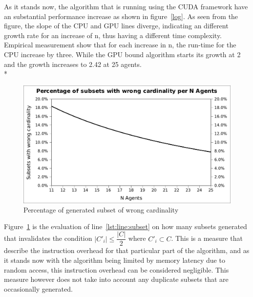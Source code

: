 \documentclass[a4paper, 12pt]{report}
\begin{document}
As it stands now, the algorithm that is running using the CUDA framework have an substantial performance increase as shown in figure~\ref{log}.
As seen from the figure, the slope of the CPU and GPU lines diverge, indicating an different growth rate for an increase of n, thus having a different time complexity.
Empirical measurement show that for each increase in n, the run-time for the CPU increase by three.
While the GPU bound algorithm starts its growth at 2 and the growth increases to 2.42 at 25 agents. \\*
\begin{figure}[htp]
\centering
\includegraphics[width=0.7\linewidth]{subset.jpg}
\caption{Percentage of generated subset of wrong cardinality\label{overhead}}
\end{figure}
\linebreak
Figure~\ref{overhead} is the evaluation of line~\ref{lst:line:subset} on how many subsets generated 
that invalidates the condition $\vert C'_{i} \vert \leq \dfrac{\vert C\vert }{2}$ where $C'_i \subset C$. This is a measure that describe the instruction overhead for that particular part of the algorithm, 
and as it stands now with the algorithm being limited by memory latency due to random access, this instruction overhead can be considered negligible.
This measure however does not take into account any duplicate subsets that are occasionally generated.
\end{document}
